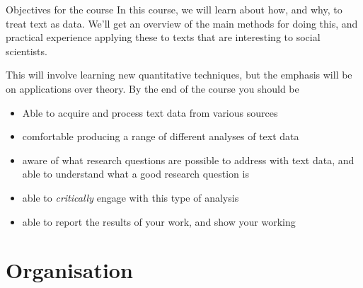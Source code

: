 \documentclass[
  10pt,
  ignorenonframetext,
  aspectratio=169]{beamer}
\providecommand{\tightlist}{%
  \setlength{\itemsep}{0pt}\setlength{\parskip}{0pt}}
\begin{document}
\begin{frame}{Objectives for the course}
\protect\hypertarget{objectives-for-the-course}{}
In this course, we will learn about how, and why, to treat text as data.
We'll get an overview of the main methods for doing this, and practical
experience applying these to texts that are interesting to social
scientists.

This will involve learning new quantitative techniques, but the emphasis
will be on applications over theory. By the end of the course you should
be

\begin{itemize}
\tightlist
\item
  Able to acquire and process text data from various sources
\item
  comfortable producing a range of different analyses of text data
\item
  aware of what research questions are possible to address with text
  data, and able to understand what a good research question is
\item
  able to \emph{critically} engage with this type of analysis
\item
  able to report the results of your work, and show your working
\end{itemize}
\end{frame}

\hypertarget{organisation}{%
\section{Organisation}\label{organisation}}
\end{document}
